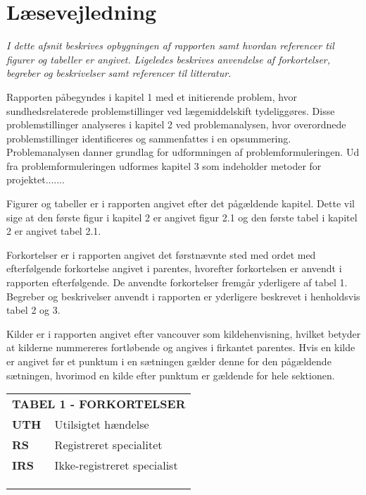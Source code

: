 \section*{Læsevejledning}
\textit{I dette afsnit beskrives opbygningen af rapporten samt hvordan referencer til figurer og tabeller er angivet. Ligeledes beskrives anvendelse af forkortelser, begreber og beskrivelser samt referencer til litteratur.}

Rapporten påbegyndes i kapitel 1 med et initierende problem, hvor sundhedsrelaterede problemstillinger ved lægemiddelskift tydeliggøres. Disse problemstillinger analyseres i kapitel 2 ved problemanalysen, hvor overordnede problemstillinger identificeres og sammenfattes i en opsummering. Problemanalysen danner grundlag for udformningen af problemformuleringen. Ud fra problemformuleringen udformes kapitel 3 som indeholder metoder for projektet.......

Figurer og tabeller er i rapporten angivet efter det pågældende kapitel. Dette vil sige at den første figur i kapitel 2 er angivet figur 2.1 og den første tabel i kapitel 2 er angivet tabel 2.1.

Forkortelser er i rapporten angivet det førstnævnte sted med ordet med efterfølgende forkortelse angivet i parentes, hvorefter forkortelsen er anvendt i rapporten efterfølgende. De anvendte forkortelser fremgår yderligere af tabel 1. Begreber og beskrivelser  anvendt i rapporten er yderligere beskrevet i henholdsvis tabel 2 og 3.

Kilder er i rapporten angivet efter vancouver som kildehenvisning, hvilket betyder at kilderne nummereres fortløbende og angives i firkantet parentes. Hvis en kilde er angivet før et punktum i en sætningen gælder denne for den pågældende sætningen, hvorimod en kilde efter punktum er gældende for hele sektionen.


\begin{table}[H]
\label{table:forkortelser}
\begin{tabular}{p{1.5cm} p{12.8cm}}
\multicolumn{2}{c}{\cellcolor[HTML]{C0C0C0}\textbf{TABEL 1 - FORKORTELSER}} \vspace{0.5cm} \\
\textbf{UTH} 
& Utilsigtet hændelse \vspace{0.5cm} \\
\textbf{RS} & Registreret specialitet \vspace{0.5cm} \\
\textbf{IRS} & Ikke-registreret specialist  \vspace{0.5cm} \\
  & \vspace{0.5cm} \\
  & \vspace{0.5cm} \\
  & \vspace{0.5cm} \\
\end{tabular}
\end{table}

